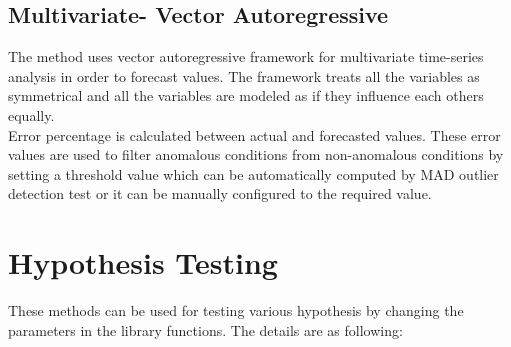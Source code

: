 \subsection{Multivariate- Vector Autoregressive}
The method uses vector autoregressive framework for multivariate time-series analysis in order to forecast values. The framework treats all the variables as symmetrical and all the variables are modeled as if they influence each others equally.
\\
Error percentage is calculated between actual and forecasted values. These error values are used to filter anomalous conditions from non-anomalous conditions by setting a threshold value which can be automatically computed by MAD outlier detection test or it can be manually configured to the required value.

\section{Hypothesis Testing}
These methods can be used for testing various hypothesis by changing the parameters in the library functions. The details are as following:

